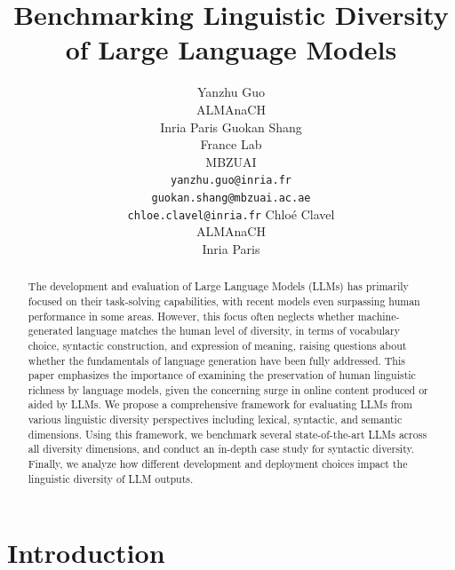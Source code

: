 \documentclass[11pt,a4paper]{article}
\title{Benchmarking Linguistic Diversity of Large Language Models}
\author{
  Yanzhu Guo\Thanks{This work was partially done during the author's affiliation with École Polytechnique.} 
  \\
  ALMAnaCH
  \\
  Inria Paris
  \And
  Guokan Shang
  \\
  France Lab
  \\
  MBZUAI\\
  \texttt{yanzhu.guo@inria.fr}\\
  \texttt{guokan.shang@mbzuai.ac.ae}\\
  \texttt{chloe.clavel@inria.fr}
  \And
  Chloé Clavel
  \\
  ALMAnaCH
  \\
  Inria Paris
}
\date{}
\begin{document}
\maketitle
\begin{abstract}
The development and evaluation of Large Language Models (LLMs) has primarily focused on their task-solving capabilities, with recent models even surpassing human performance in some areas. However, this focus often neglects whether machine-generated language matches the human level of diversity, in terms of vocabulary choice, syntactic construction, and expression of meaning, raising questions about whether the fundamentals of language generation have been fully addressed.
This paper emphasizes the importance of examining the preservation of human linguistic richness by language models, given the concerning surge in online content produced or aided by LLMs.
We propose a comprehensive framework for evaluating LLMs from various linguistic diversity perspectives including lexical, syntactic, and semantic dimensions. Using this framework, we benchmark several state-of-the-art LLMs across all diversity dimensions, and conduct an in-depth case study for syntactic diversity. Finally, we analyze how different development and deployment choices impact the linguistic diversity of LLM outputs.


\end{abstract}

\section{Introduction}

\end{document}
